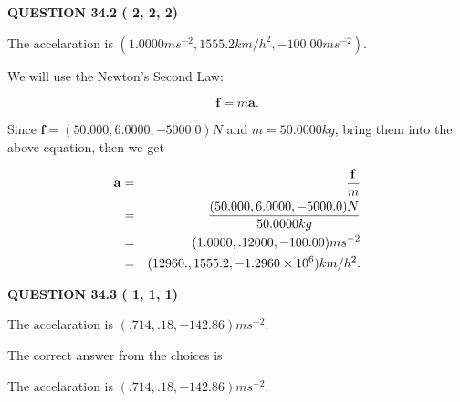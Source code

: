 \documentclass[12pt]{article}
\begin{document}
   
  
\vspace{0.2in}
  
{\textbf{\Large{QUESTION
34.2 
 (          2,          2,          2)
}}}
  
  
 
 
\noindent{}
 
 
The accelaration is
$(
1.0000ms^{-2},
1555.2km/h^2,
-100.00ms^{-2}
).
$
 
 
 
 
 
 
\noindent{}

We will use the Newton's Second Law:
 
\[
\mathbf{f}=m\mathbf{a}.
\]
 
Since $\mathbf{f}=( %
50.000,  %
6.0000,  %
-5000.0 )N$
and $m= %
50.0000kg$, bring them into the above equation, then we get
 
\begin{eqnarray*}
\mathbf{a}&=&\frac{\mathbf{f}}m  \\
&=&\frac{(
50.000 ,
6.0000 ,
-5000.0 )N
}{ %
50.0000 kg}  \\
&=&(
1.0000 ,
.12000,
-100.00
)ms^{-2} \\
&=&(
12960. ,
1555.2 ,
-1.2960 \times 10^{6}
)km/h^2.
\end{eqnarray*}
 
 
 
  
\vspace{0.2in}
  
{\textbf{\Large{QUESTION
34.3 
 (          1,          1,          1)
}}}
  
  


 
 
\noindent{}
 
 
The accelaration is $  %
(
.714,
.18,
-142.86)
ms^{-2} $.
 
 
 
 
 
 
\noindent{}

The correct answer from the choices is


The accelaration is $  %
(
.714,
.18,
-142.86)
ms^{-2} $.
 
\end{document}

